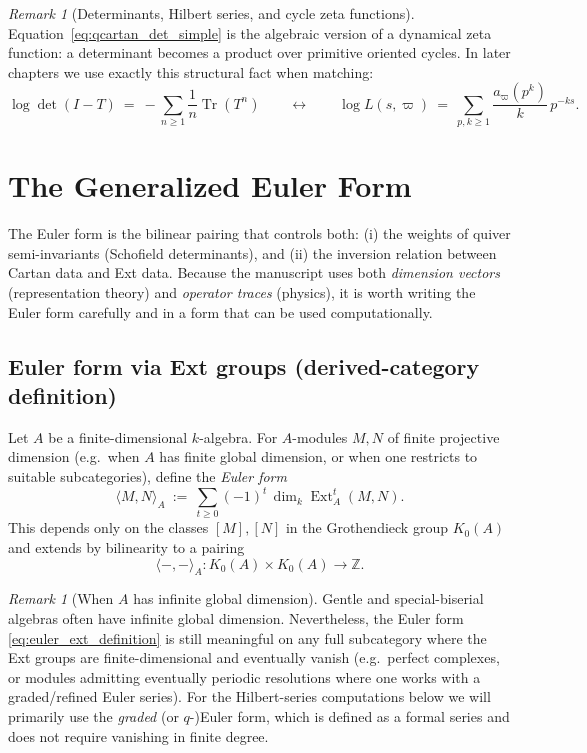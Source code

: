 \documentclass[11pt,oneside]{amsbook}
\numberwithin{equation}{section}
\theoremstyle{plain}
\theoremstyle{definition}
\theoremstyle{remark}
\newtheorem{remark}[theorem]{Remark}
\DeclareMathOperator{\Ext}{\mathrm{Ext}}
\DeclareMathOperator{\Tr}{\mathrm{Tr}}
\begin{document}
\begin{remark}[Determinants, Hilbert series, and cycle zeta functions]
Equation~\eqref{eq:qcartan_det_simple} is the algebraic version of a dynamical zeta function:
a determinant becomes a product over primitive oriented cycles.
In later chapters we use exactly this structural fact when matching:
\[
\log\det(I-T)\ =\ -\sum_{n\ge 1}\frac{1}{n}\Tr(T^n)
\qquad\longleftrightarrow\qquad
\log L(s,\varpi)\ =\ \sum_{p,k\ge 1} \frac{a_\varpi(p^k)}{k}\,p^{-ks}.
\]
\end{remark}


	
	
	
	
	
	\section{The Generalized Euler Form}

\noindent
The Euler form is the bilinear pairing that controls both:
(i) the weights of quiver semi-invariants (Schofield determinants), and
(ii) the inversion relation between Cartan data and Ext data.
Because the manuscript uses both \emph{dimension vectors} (representation theory) and \emph{operator traces} (physics),
it is worth writing the Euler form carefully and in a form that can be used computationally.

\subsection{Euler form via Ext groups (derived-category definition)}
Let $A$ be a finite-dimensional $k$-algebra.
For $A$-modules $M,N$ of finite projective dimension (e.g.\ when $A$ has finite global dimension, or when one restricts to suitable subcategories),
define the \emph{Euler form}
\begin{equation}
\label{eq:euler_ext_definition}
\langle M,N\rangle_A\ :=\ \sum_{t\ge 0}(-1)^t\,\dim_k \Ext_A^t(M,N).
\end{equation}
This depends only on the classes $[M],[N]$ in the Grothendieck group $K_0(A)$ and extends by bilinearity to a pairing
\[
\langle -,-\rangle_A:K_0(A)\times K_0(A)\to \mathbb{Z}.
\]

\begin{remark}[When $A$ has infinite global dimension]
Gentle and special-biserial algebras often have infinite global dimension.
Nevertheless, the Euler form \eqref{eq:euler_ext_definition} is still meaningful on any full subcategory where the Ext groups are finite-dimensional and eventually vanish (e.g.\ perfect complexes, or modules admitting eventually periodic resolutions where one works with a graded/refined Euler series).
For the Hilbert-series computations below we will primarily use the \emph{graded} (or $q$-)Euler form, which is defined as a formal series and does not require vanishing in finite degree.
\end{remark}
\end{document}

